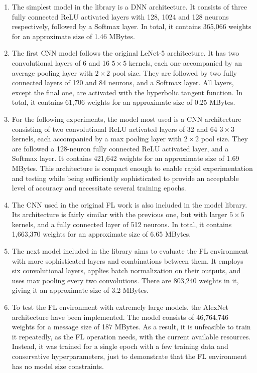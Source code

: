\begin{enumerate}

    \item The simplest model in the library is a DNN architecture. It consists of three fully connected ReLU activated layers with 128, 1024 and 128 neurons respectively, followed by a Softmax layer. In total, it contains 365,066 weights for an approximate size of 1.46 MBytes.
    
    \item The first CNN model follows the original LeNet-5 architecture. It has two convolutional layers of 6 and 16 \(5\times5\) kernels, each one accompanied by an average pooling layer with \(2\times2\) pool size. They are followed by two fully connected layers of 120 and 84 neurons, and a Softmax layer. All layers, except the final one, are activated with the hyperbolic tangent function. In total, it contains 61,706 weights for an approximate size of 0.25 MBytes.
    
    \item For the following experiments, the model most used is a CNN architecture consisting of two convolutional ReLU activated layers of 32 and 64 \(3\times3\) kernels, each accompanied by a max pooling layer with \(2\times2\) pool size. They are followed a 128-neuron fully connected ReLU activated layer, and a Softmax layer. It contains 421,642 weights for an approximate size of 1.69 MBytes. This architecture is compact enough to enable rapid experimentation and testing while being sufficiently sophisticated to provide an acceptable level of accuracy and necessitate several training epochs.
    
    \item The CNN used in the original FL work \cite{FL-original-paper} is also included in the model library. Its architecture is fairly similar with the previous one, but with larger \(5\times5\) kernels, and a fully connected layer of 512 neurons. In total, it contains 1,663,370 weights for an approximate size of 6.65 MBytes.
    
    \item The next model included in the library aims to evaluate the FL environment with more sophisticated layers and combinations between them. It employs six convolutional layers, applies batch normalization on their outputs, and uses max pooling every two convolutions. There are 803,240 weights in it, giving it an approximate size of 3.2 MBytes.
    
    \item To test the FL environment with extremely large models, the AlexNet architecture have been implemented. The model consists of 46,764,746 weights for a message size of 187 MBytes. As a result, it is unfeasible to train it repeatedly, as the FL operation needs, with the current available resources. Instead, it was trained for a single epoch with a few training data and conservative hyperparameters, just to demonstrate that the FL environment has no model size constraints.


\end{enumerate}
